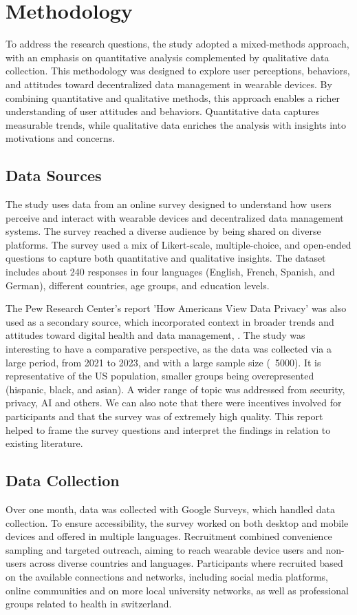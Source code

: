 \section{Methodology}

To address the research questions, the study adopted a mixed-methods approach, with an emphasis on quantitative analysis complemented by qualitative data collection. This methodology was designed to explore user perceptions, behaviors, and attitudes toward decentralized data management in wearable devices. By combining quantitative and qualitative methods, this approach enables a richer understanding of user attitudes and behaviors. Quantitative data captures measurable trends, while qualitative data enriches the analysis with insights into motivations and concerns.
\subsection{Data Sources}

The study uses data from an online survey designed to understand how users perceive and interact with wearable devices and decentralized data management systems. The survey reached a diverse audience by being shared on diverse platforms. The survey used a mix of Likert-scale, multiple-choice, and open-ended questions to capture both quantitative and qualitative insights.
The dataset includes about 240 responses in four languages (English, French, Spanish, and German), different countries, age groups, and education levels.

The Pew Research Center's report 'How Americans View Data Privacy' was also used as a secondary source, which incorporated context in broader trends and attitudes toward digital health and data management, \cite{Pew2023}. The study was interesting to have a comparative perspective, as the data was collected via a large period, from 2021 to 2023, and with a large sample size (~5000). It is representative of the US population, smaller groups being overepresented (hispanic, black, and asian). A wider range of topic was addressed from security, privacy, AI and others. We can also note that there were incentives involved for participants and that the survey was of extremely high quality. This report helped to frame the survey questions and interpret the findings in relation to existing literature.
\subsection{Data Collection}
Over one month, data was collected with Google Surveys, which handled data collection. To ensure accessibility, the survey worked on both desktop and mobile devices and offered in multiple languages. Recruitment combined convenience sampling and targeted outreach, aiming to reach wearable device users and non-users across diverse countries and languages.
Participants where recruited based on the available connections and networks, including social media platforms, online communities and on more local university networks, as well as professional groups related to health in switzerland.

